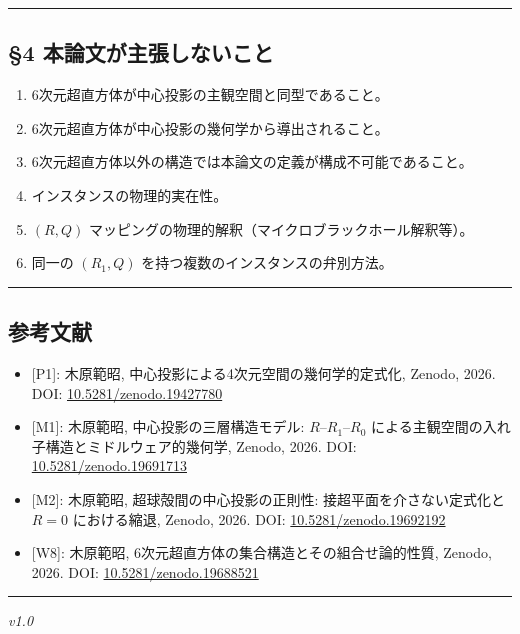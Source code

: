 \documentclass[
  a4paper,11pt]{ltjsarticle}
\providecommand{\tightlist}{%
  \setlength{\itemsep}{0pt}\setlength{\parskip}{0pt}}
\theoremstyle{definition}
\theoremstyle{remark}
\begin{document}
\begin{center}\rule{0.5\linewidth}{0.5pt}\end{center}

\subsection{§4
本論文が主張しないこと}\label{ux672cux8ad6ux6587ux304cux4e3bux5f35ux3057ux306aux3044ux3053ux3068}

\begin{enumerate}
\def\labelenumi{\arabic{enumi}.}
\tightlist
\item
  6次元超直方体が中心投影の主観空間と同型であること。
\item
  6次元超直方体が中心投影の幾何学から導出されること。
\item
  6次元超直方体以外の構造では本論文の定義が構成不可能であること。
\item
  インスタンスの物理的実在性。
\item
  \((R, Q)\) マッピングの物理的解釈（マイクロブラックホール解釈等）。
\item
  同一の \((R_1, Q)\) を持つ複数のインスタンスの弁別方法。
\end{enumerate}

\begin{center}\rule{0.5\linewidth}{0.5pt}\end{center}

\subsection{参考文献}\label{ux53c2ux8003ux6587ux732e}

\begin{itemize}
\tightlist
\item
  {[}P1{]}: 木原範昭, 中心投影による4次元空間の幾何学的定式化, Zenodo,
  2026. DOI:
  \href{https://doi.org/10.5281/zenodo.19427780}{10.5281/zenodo.19427780}
\item
  {[}M1{]}: 木原範昭, 中心投影の三層構造モデル: \(R\)--\(R_1\)--\(R_0\)
  による主観空間の入れ子構造とミドルウェア的幾何学, Zenodo, 2026. DOI:
  \href{https://doi.org/10.5281/zenodo.19691713}{10.5281/zenodo.19691713}
\item
  {[}M2{]}: 木原範昭, 超球殻間の中心投影の正則性:
  接超平面を介さない定式化と \(R = 0\) における縮退, Zenodo, 2026. DOI:
  \href{https://doi.org/10.5281/zenodo.19692192}{10.5281/zenodo.19692192}
\item
  {[}W8{]}: 木原範昭, 6次元超直方体の集合構造とその組合せ論的性質,
  Zenodo, 2026. DOI:
  \href{https://doi.org/10.5281/zenodo.19688521}{10.5281/zenodo.19688521}
\end{itemize}

\begin{center}\rule{0.5\linewidth}{0.5pt}\end{center}

\emph{v1.0}
\end{document}
